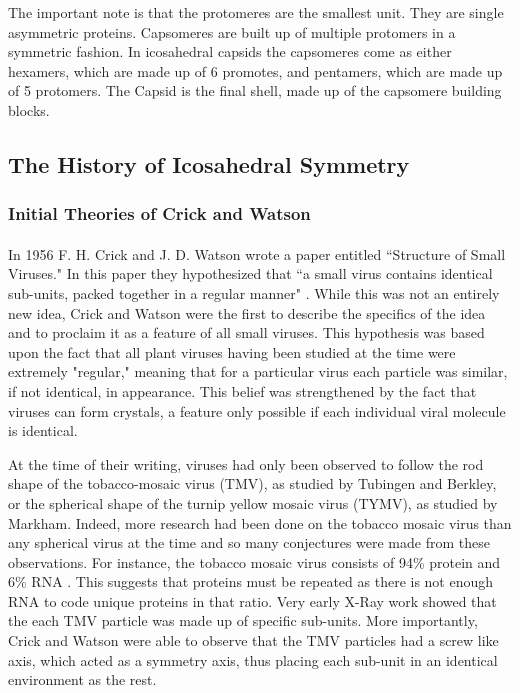 \documentclass[12pt,letter]{article}
\begin{document}
The important note is that the protomeres are the smallest unit. They are single asymmetric proteins. Capsomeres are built up of multiple protomers in a symmetric fashion. In icosahedral capsids the capsomeres come as either hexamers, which are made up of 6 promotes, and pentamers, which are made up of 5 protomers. The Capsid is the final shell, made up of the capsomere building blocks.

\subsection{The History of Icosahedral Symmetry} %

\subsubsection{Initial Theories of Crick and Watson} \label{sec:C&W}
\paragraph{}
In 1956  F. H. Crick and J. D. Watson wrote a paper entitled ``Structure of Small Viruses." In this paper they hypothesized that ``a small virus contains identical sub-units, packed together in a regular manner" \cite[p 473]{Crick:1956}. While this was not an entirely new idea, Crick and Watson were the first to describe the specifics of the idea and to proclaim it as a feature of all small viruses. This hypothesis was based upon the fact that all plant viruses having been studied at the time were extremely "regular," meaning that for a particular virus each particle was similar, if not identical, in appearance. This belief was strengthened by the fact that viruses can form crystals, a feature only possible if each individual viral molecule is identical.

At the time of their writing, viruses had only been observed to follow the rod shape of the tobacco-mosaic virus (TMV), as studied by Tubingen and Berkley, or the spherical shape of the turnip yellow mosaic virus (TYMV), as studied by Markham. Indeed, more research had been done on the tobacco mosaic virus than any spherical virus at the time and so many conjectures were made from these observations. For instance, the tobacco mosaic virus consists of 94\% protein and 6\% RNA \cite[p 473]{Crick:1956}. This suggests that proteins must be repeated as there is not enough RNA to code unique proteins in that ratio. Very early X-Ray work showed that the each TMV particle was made up of specific sub-units. More importantly, Crick and Watson were able to observe that the TMV particles had a screw like axis, which acted as a symmetry axis, thus placing each sub-unit in an identical environment as the rest.
\end{document}
